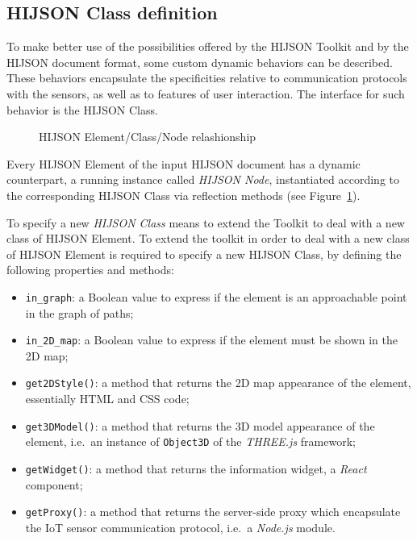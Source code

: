 \subsection{HIJSON Class definition}\label{hijson-class-definition}

To make better use of the possibilities offered by the HIJSON Toolkit and by the
HIJSON document format, some custom dynamic behaviors can be described. These
behaviors encapsulate the specificities relative to communication
protocols with the sensors, as well as to features of user interaction. The
interface for such behavior is the HIJSON Class.

\begin{figure}[!h]
\centering
{}
\caption{HIJSON Element/Class/Node relashionship}
\label{fig:elem-class-node-rel}
\end{figure}

Every HIJSON Element of the input HIJSON document has a dynamic
counterpart, a running instance called \emph{HIJSON Node}, instantiated
according to the corresponding HIJSON Class via reflection methods (see
Figure~\ref{fig:elem-class-node-rel}).

To specify a new \emph{HIJSON Class} means to extend the Toolkit to deal with a
new class of HIJSON Element.
To extend the toolkit in order to deal with a new class of HIJSON Element is
required to specify a new HIJSON Class, by defining the following
properties and methods:

\begin{itemize}
\item
 \texttt{in\_graph}: a Boolean value to express if the element is an
 approachable point in the graph of paths;
\item
 \texttt{in\_2D\_map}: a Boolean value to express if the element must 
 be shown in the 2D map;
\item
 \texttt{get2DStyle()}: a method that returns the 2D map appearance of
 the element, essentially HTML and CSS code;
\item
 \texttt{get3DModel()}: a method that returns the 3D model appearance of
 the element, i.e.~an instance of \texttt{Obj\-ect\-3D} of the \emph{THREE.js} 
 framework;
\item
 \texttt{getWidget()}: a method that returns the information widget, a
 \emph{React} component;
\item
 \texttt{getProxy()}: a method that returns the server-side proxy which
 encapsulate the IoT sensor communication protocol, i.e.~a \emph{Node.js}
 module.
\end{itemize}

